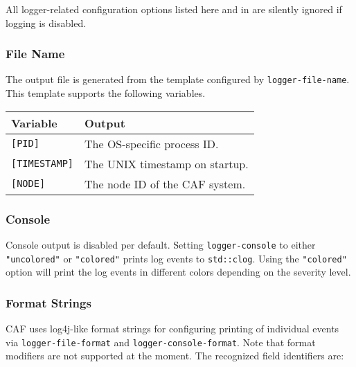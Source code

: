 All logger-related configuration options listed here and in
 are silently ignored if logging is disabled.

\subsubsection{File Name}
\label{log-output-file-name}

The output file is generated from the template configured by
\lstinline^logger-file-name^. This template supports the following variables.

\begin{tabular}{ll}
  \hline
  \textbf{Variable} & \textbf{Output} \\
  \hline
  \texttt{[PID]} & The OS-specific process ID. \\
  \hline
  \texttt{[TIMESTAMP]} & The UNIX timestamp on startup. \\
  \hline
  \texttt{[NODE]} & The node ID of the CAF system. \\
  \hline
\end{tabular}

\subsubsection{Console}
\label{log-output-console}

Console output is disabled per default. Setting \lstinline^logger-console^ to
either \lstinline^"uncolored"^ or \lstinline^"colored"^ prints log events to
\lstinline^std::clog^. Using the \lstinline^"colored"^ option will print the
log events in different colors depending on the severity level.

\subsubsection{Format Strings}
\label{log-output-format-strings}

CAF uses log4j-like format strings for configuring printing of individual
events via \lstinline^logger-file-format^ and
\lstinline^logger-console-format^. Note that format modifiers are not supported
at the moment. The recognized field identifiers are:

